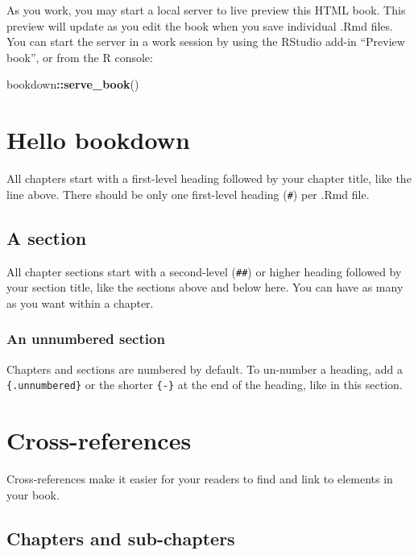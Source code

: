 \documentclass[
]{book}
\newenvironment{Shaded}{\begin{snugshade}}{\end{snugshade}}
\newcommand{\FunctionTok}[1]{\textcolor[rgb]{0.13,0.29,0.53}{\textbf{#1}}}
\newcommand{\NormalTok}[1]{#1}
\newcommand{\SpecialCharTok}[1]{\textcolor[rgb]{0.81,0.36,0.00}{\textbf{#1}}}
\theoremstyle{definition}
\theoremstyle{definition}
\theoremstyle{definition}
\theoremstyle{definition}
\theoremstyle{remark}
\begin{document}
As you work, you may start a local server to live preview this HTML book. This preview will update as you edit the book when you save individual .Rmd files. You can start the server in a work session by using the RStudio add-in ``Preview book'', or from the R console:

\begin{Shaded}
\begin{Highlighting}[]
\NormalTok{bookdown}\SpecialCharTok{::}\FunctionTok{serve\_book}\NormalTok{()}
\end{Highlighting}
\end{Shaded}

\section{Hello bookdown}\label{hello-bookdown}

All chapters start with a first-level heading followed by your chapter title, like the line above. There should be only one first-level heading (\texttt{\#}) per .Rmd file.

\subsection{A section}\label{a-section}

All chapter sections start with a second-level (\texttt{\#\#}) or higher heading followed by your section title, like the sections above and below here. You can have as many as you want within a chapter.

\subsubsection*{An unnumbered section}\label{an-unnumbered-section}

Chapters and sections are numbered by default. To un-number a heading, add a \texttt{\{.unnumbered\}} or the shorter \texttt{\{-\}} at the end of the heading, like in this section.

\section{Cross-references}\label{cross}

Cross-references make it easier for your readers to find and link to elements in your book.

\subsection{Chapters and sub-chapters}\label{chapters-and-sub-chapters}
\end{document}
